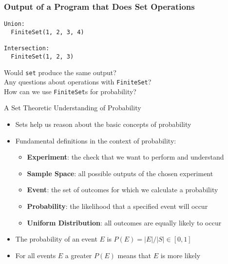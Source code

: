 \documentclass[14pt,aspectratio=169]{beamer}
\begin{document}
%
\begin{frame}[fragile]
  \frametitle{Output of a Program that Does Set Operations}
  \normalsize
  \begin{minipage}{6in}
    \vspace*{.25in}
    \begin{verbatim}
Union:
  FiniteSet(1, 2, 3, 4)

Intersection:
  FiniteSet(1, 2, 3)
    \end{verbatim}
  \end{minipage}
  \vspace*{.25in}
  \begin{center}
    \normalsize \noindent Would {\tt set} produce the same output? \\
    \normalsize \noindent Any questions about operations with {\tt FiniteSet}? \\
    \normalsize \noindent How can we use {\tt FiniteSet}s for probability? \\
  \end{center}
\end{frame}

%
\begin{frame}{A Set Theoretic Understanding of Probability}
  \begin{itemize}
    \item Sets help us reason about the basic concepts of probability
      \vspace*{-.15in}
    \item Fundamental definitions in the context of probability:
      \begin{itemize}
        \item {\bf Experiment}: the check that we want to perform and understand
        \item {\bf Sample Space}: all possible outputs of the chosen experiment
        \item {\bf Event}: the set of outcomes for which we calculate a
          probability
        \item {\bf Probability}: the likelihood that a specified event will occur
        \item {\bf Uniform Distribution}: all outcomes are equally likely to
          occur
      \end{itemize}
      \vspace*{-.2in}
    \item The probability of an event $E$ is $P(E) = |E| / |S| \in [0,1]$
      \vspace*{-.2in}
    \item For all events $E$ a greater $P(E)$ means that $E$ is more likely
  \end{itemize}
\end{frame}
\end{document}
